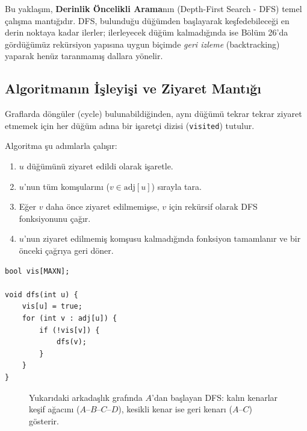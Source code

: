 Bu yaklaşım, \textbf{Derinlik Öncelikli Arama}nın (Depth-First Search - DFS) temel çalışma mantığıdır. DFS, bulunduğu düğümden başlayarak keşfedebileceği en derin noktaya kadar ilerler; ilerleyecek düğüm kalmadığında ise Bölüm 26'da gördüğümüz rekürsiyon yapısına uygun biçimde \emph{geri izleme} (backtracking) yaparak henüz taranmamış dallara yönelir.

\subsection{Algoritmanın İşleyişi ve Ziyaret Mantığı}
Graflarda döngüler (cycle) bulunabildiğinden, aynı düğümü tekrar tekrar ziyaret etmemek için her düğüm adına bir işaretçi dizisi (\texttt{visited}) tutulur.

Algoritma şu adımlarla çalışır:
\begin{enumerate}
    \item $u$ düğümünü ziyaret edildi olarak işaretle.
    \item $u$'nun tüm komşularını ($v \in \text{adj}[u]$) sırayla tara.
    \item Eğer $v$ daha önce ziyaret edilmemişse, $v$ için rekürsif olarak DFS fonksiyonunu çağır.
    \item $u$'nun ziyaret edilmemiş komşusu kalmadığında fonksiyon tamamlanır ve bir önceki çağrıya geri döner.
\end{enumerate}

\begin{lstlisting}[language=CTemel]
bool vis[MAXN];

void dfs(int u) {
    vis[u] = true;
    for (int v : adj[u]) {
        if (!vis[v]) {
            dfs(v);
        }
    }
}
\end{lstlisting}

\begin{figure}[ht]
\centering
{}
\caption{Yukarıdaki arkadaşlık grafında $A$'dan başlayan DFS: kalın kenarlar keşif
ağacını ($A$--$B$--$C$--$D$), kesikli kenar ise geri kenarı ($A$--$C$) gösterir.}
\end{figure}

